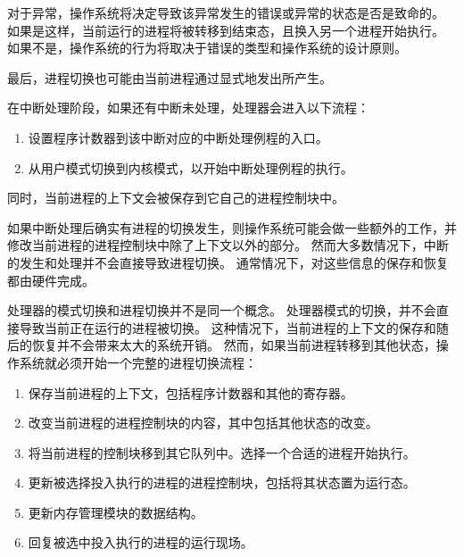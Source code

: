 {{{            对于异常，操作系统将决定导致该异常发生的错误或异常的状态是否是致命的。
            如果是这样，当前运行的进程将被转移到结束态，且换入另一个进程开始执行。
            如果不是，操作系统的行为将取决于错误的类型和操作系统的设计原则。

            最后，进程切换也可能由当前进程通过显式地发出所产生。
        }

        {
            在中断处理阶段，如果还有中断未处理，处理器会进入以下流程：

            \begin{enumerate}
                \item 设置程序计数器到该中断对应的中断处理例程的入口。
                \item 从用户模式切换到内核模式，以开始中断处理例程的执行。
            \end{enumerate}

            同时，当前进程的上下文会被保存到它自己的进程控制块中。

            如果中断处理后确实有进程的切换发生，则操作系统可能会做一些额外的工作，并修改当前进程的进程控制块中除了上下文以外的部分。
            然而大多数情况下，中断的发生和处理并不会直接导致进程切换。
            通常情况下，对这些信息的保存和恢复都由硬件完成。
        }

        {
            处理器的模式切换和进程切换并不是同一个概念。
            处理器模式的切换，并不会直接导致当前正在运行的进程被切换。
            这种情况下，当前进程的上下文的保存和随后的恢复并不会带来太大的系统开销。
            然而，如果当前进程转移到其他状态，操作系统就必须开始一个完整的进程切换流程：

            \begin{enumerate}
                \item 保存当前进程的上下文，包括程序计数器和其他的寄存器。
                \item 改变当前进程的进程控制块的内容，其中包括其他状态的改变。
                \item 将当前进程的控制块移到其它队列中。选择一个合适的进程开始执行。
                \item 更新被选择投入执行的进程的进程控制块，包括将其状态置为运行态。
                \item 更新内存管理模块的数据结构。
                \item 回复被选中投入执行的进程的运行现场。
            \end{enumerate}
        }
    }
}
